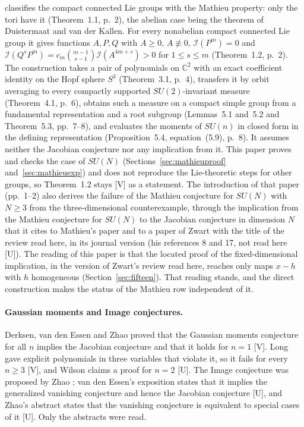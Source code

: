 \documentclass[11pt]{article}
\theoremstyle{remark}
\newcommand{\C}{\mathbb{C}}
\begin{document}
classifies the compact connected Lie groups with the Mathieu property: only the tori have it (Theorem~1.1, p.~2), the abelian case being the theorem of Duistermaat and van der Kallen. For every nonabelian compact connected Lie group it gives functions $A,P,Q$ with $A\ge0$, $A\not\equiv0$, $\mathcal I(P^m)=0$ and $\mathcal I(Q^sP^m)=c_m\binom{m-1}{s-1}\mathcal I(A^{4m+s})>0$ for $1\le s\le m$ (Theorem~1.2, p.~2). The construction takes a pair of polynomials on $\C^2$ with an exact coefficient identity on the Hopf sphere $S^3$ (Theorem~3.1, p.~4), transfers it by orbit averaging to every compactly supported $SU(2)$-invariant measure (Theorem~4.1, p.~6), obtains such a measure on a compact simple group from a fundamental representation and a root subgroup (Lemmas~5.1 and~5.2 and Theorem~5.3, pp.~7--8), and evaluates the moments of $SU(n)$ in closed form in the defining representation (Proposition~5.4, equation~(5.9), p.~8). It assumes neither the Jacobian conjecture nor any implication from it. This paper proves and checks the case of $SU(N)$ (Sections~\ref{sec:mathieuproof} and~\ref{sec:mathieuexp}) and does not reproduce the Lie-theoretic steps for other groups, so Theorem~1.2 stays [V] as a statement. The introduction of that paper (pp.~1--2) also derives the failure of the Mathieu conjecture for $SU(N)$ with $N\ge3$ from the three-dimensional counterexample, through the implication from the Mathieu conjecture for $SU(N)$ to the Jacobian conjecture in dimension $N$ that it cites to Mathieu's paper and to a paper of Zwart with the title of the review read here, in its journal version (his references 8 and 17, not read here [U]). The reading of this paper is that the located proof of the fixed-dimensional implication, in the version of Zwart's review read here, reaches only maps $x-h$ with $h$ homogeneous (Section~\ref{sec:fifteen}). That reading stands, and the direct construction makes the status of the Mathieu row independent of it.

\paragraph{Gaussian moments and Image conjectures.} Derksen, van den Essen and Zhao proved that the Gaussian moments conjecture for all $n$ implies the Jacobian conjecture \cite[Theorem~1.6, p.~2]{DEZ2017} and that it holds for $n=1$ \cite[Proposition~4.2, p.~6]{DEZ2017} [V]. Long gave explicit polynomials in three variables that violate it, so it fails for every $n\ge3$ \cite[abstract, p.~1; Corollary~5.2, p.~6]{Long2026} [V], and Wilson claims a proof for $n=2$ \cite[abstract, p.~1]{Wilson2026} [U]. The Image conjecture was proposed by Zhao \cite{Zhao2010}; van den Essen's exposition states that it implies the generalized vanishing conjecture and hence the Jacobian conjecture \cite[abstract, p.~1]{vdE2010} [U], and Zhao's abstract states that the vanishing conjecture is equivalent to special cases of it \cite[abstract, p.~1]{Zhao2010} [U]. Only the abstracts were read.
\end{document}
